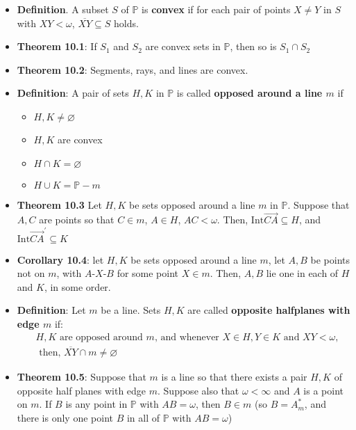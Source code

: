 \documentclass{report}
\begin{document}
\begin{itemize}
        \item \textbf{Definition}. A subset $S$ of $\mathbb{P}$ is \textbf{convex} if for each pair of points $X \ne Y$ in $S$ with $XY < \omega$, $\overline{XY} \subseteq S$ holds.
        \item \textbf{Theorem 10.1}: If $S_{1}$ and $S_{2}$ are convex sets in $\mathbb{P}$, then so is $S_{1} \cap S_{2}$
        \item \textbf{Theorem 10.2}: Segments, rays, and lines are convex.
        \item \textbf{Definition}: A pair of sets $H,K$ in $\mathbb{P}$ is called \textbf{opposed around a line $m$} if 
            \begin{itemize}
                \item $H,K \ne \varnothing $
                \item $H,K$ are convex
                \item $H \cap K = \varnothing $
                \item $H \cup K = \mathbb{P} - m$
            \end{itemize}
        \item \textbf{Theorem 10.3} Let $H,K$ be sets opposed around a line $m$ in $\mathbb{P}$. Suppose that $A,C$ are points so that $C \in m$, $A \in H$, $AC < \omega$. Then, $\text{Int}\overrightarrow{CA} \subseteq H$, and $\text{Int}\overrightarrow{CA}^{\prime} \subseteq K $
        \item \textbf{Corollary 10.4}: let $H,K$ be sets opposed around a line $m$, let $A,B$ be points not on $m$, with $ A\text{-}X\text{-}B$ for some point $X \in m$. Then, $A,B$ lie one in each of $H$ and $K$, in some order.
        \item \textbf{Definition}: Let $m$ be a line. Sets $H,K$ are called \textbf{opposite halfplanes with edge $m$} if:
            \bigbreak \noindent 
            \begin{align*}
                &H,K \text{ are opposed around $m$, and whenever } X \in H, Y \in K \text{ and } XY < \omega, \\ &\text{ then, } \overline{XY} \cap m \ne \varnothing
            \end{align*}
        \item \textbf{Theorem 10.5}: Suppose that $m$ is a line  so that there exists a pair $H,K$ of opposite half planes with edge $m$. Suppose also that $\omega < \infty$ and $A$ is a point on $m$. If $B$ is any point in $\mathbb{P}$ with $AB = \omega$, then $B \in m$ (so $B = A_{m}^{*}$, and there is only one point $B$ in all of $\mathbb{P}$ with $AB = \omega$)

\end{itemize}
\end{document}
